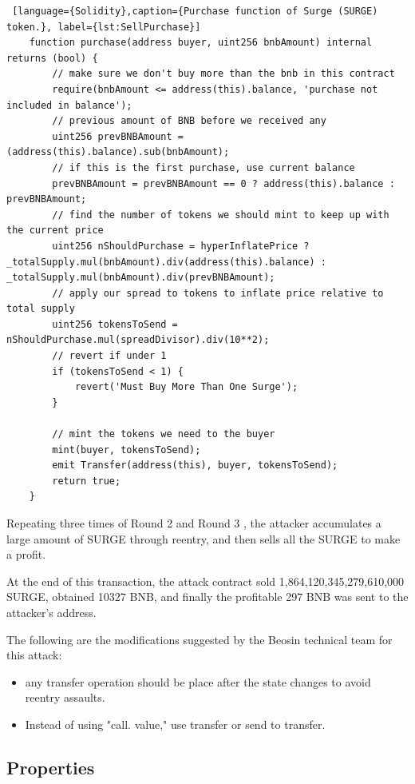 \begin{lstlisting} [language={Solidity},caption={Purchase function of Surge (SURGE) token.}, label={lst:SellPurchase}]
    function purchase(address buyer, uint256 bnbAmount) internal returns (bool) {
        // make sure we don't buy more than the bnb in this contract
        require(bnbAmount <= address(this).balance, 'purchase not included in balance');
        // previous amount of BNB before we received any        
        uint256 prevBNBAmount = (address(this).balance).sub(bnbAmount);
        // if this is the first purchase, use current balance
        prevBNBAmount = prevBNBAmount == 0 ? address(this).balance : prevBNBAmount;
        // find the number of tokens we should mint to keep up with the current price
        uint256 nShouldPurchase = hyperInflatePrice ? _totalSupply.mul(bnbAmount).div(address(this).balance) : _totalSupply.mul(bnbAmount).div(prevBNBAmount);
        // apply our spread to tokens to inflate price relative to total supply
        uint256 tokensToSend = nShouldPurchase.mul(spreadDivisor).div(10**2);
        // revert if under 1
        if (tokensToSend < 1) {
            revert('Must Buy More Than One Surge');
        }
        
        // mint the tokens we need to the buyer
        mint(buyer, tokensToSend);
        emit Transfer(address(this), buyer, tokensToSend);
        return true;
    }
\end{lstlisting}

Repeating three times of Round 2 and Round 3 , the attacker accumulates a large amount of SURGE through reentry, and then sells all the SURGE to make a profit.

At the end of this transaction, the attack contract sold 1,864,120,345,279,610,000 SURGE, 
obtained 10327 BNB, and finally the profitable 297 BNB was sent to the attacker's address.

The following are the modifications suggested by the Beosin technical team for this attack:
\begin{itemize}
    \item any transfer operation should be place after the state changes to avoid reentry assaults.
    \item Instead of using "call. value," use transfer or send to transfer. 
\end{itemize}

\subsection{Properties}

